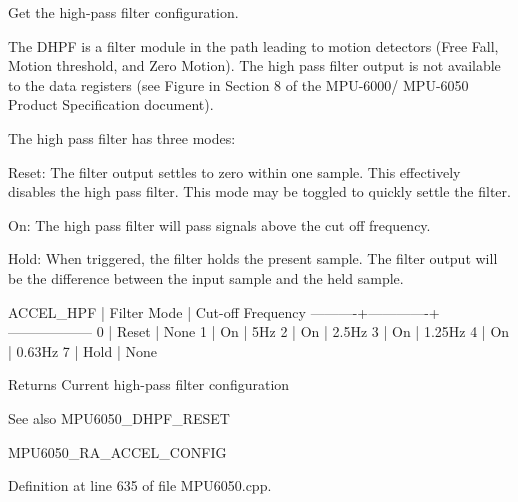 Get the high-\/pass filter configuration. 

The D\+H\+PF is a filter module in the path leading to motion detectors (Free Fall, Motion threshold, and Zero Motion). The high pass filter output is not available to the data registers (see Figure in Section 8 of the M\+P\+U-\/6000/ M\+P\+U-\/6050 Product Specification document).

The high pass filter has three modes\+:


\begin{DoxyPre}
   Reset: The filter output settles to zero within one sample. This
          effectively disables the high pass filter. This mode may be toggled
          to quickly settle the filter.\end{DoxyPre}



\begin{DoxyPre}   On:    The high pass filter will pass signals above the cut off frequency.\end{DoxyPre}



\begin{DoxyPre}   Hold:  When triggered, the filter holds the present sample. The filter
          output will be the difference between the input sample and the held
          sample.
\end{DoxyPre}



\begin{DoxyPre}
ACCEL\_HPF | Filter Mode | Cut-off Frequency
----------+-------------+------------------
0         | Reset       | None
1         | On          | 5Hz
2         | On          | 2.5Hz
3         | On          | 1.25Hz
4         | On          | 0.63Hz
7         | Hold        | None
\end{DoxyPre}


\begin{DoxyReturn}{Returns}
Current high-\/pass filter configuration 
\end{DoxyReturn}
\begin{DoxySeeAlso}{See also}
M\+P\+U6050\+\_\+\+D\+H\+P\+F\+\_\+\+R\+E\+S\+ET 

M\+P\+U6050\+\_\+\+R\+A\+\_\+\+A\+C\+C\+E\+L\+\_\+\+C\+O\+N\+F\+IG 
\end{DoxySeeAlso}


Definition at line 635 of file M\+P\+U6050.\+cpp.

\mbox{\label{classMPU6050_a9f2737fe22955fd85b2575ba8da874c6}} 
